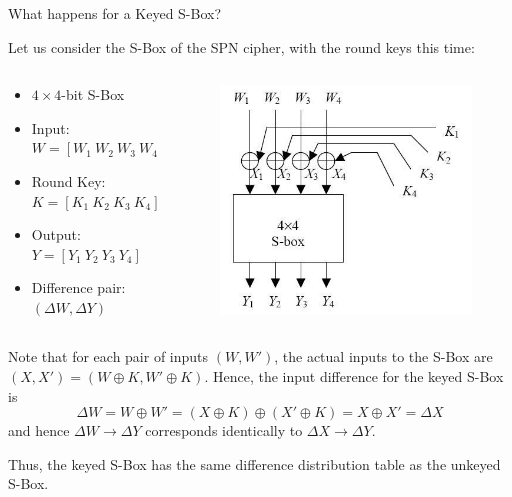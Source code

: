 \documentclass[9pt]{beamer}
\begin{document}
\begin{frame}
What happens for a Keyed S-Box?

Let us consider the S-Box of the SPN cipher, with the round keys this time:
\begin{columns}
\begin{column}{0.5\textwidth}
\begin{itemize}
\item{$4 \times 4$-bit S-Box}
\item{Input: $W = [W_1 \: W_2 \: W_3 \: W_4]$}
\item{Round Key: $K = [K_1 \: K_2 \: K_3 \: K_4]$}
\item{Output: $Y = [Y_1 \: Y_2 \: Y_3 \: Y_4]$}
\item{Difference pair: $(\Delta W, \Delta Y)$}
\end{itemize}
\end{column}
\begin{column}{0.5\textwidth}
\begin{figure}
\includegraphics[totalheight=0.3\textheight]{spn_sbox_keyed.jpg}
\end{figure}
\end{column}
\end{columns}

Note that for each pair of inputs $(W,W')$, the actual inputs to the S-Box are $(X,X') = (W \oplus K, W' \oplus K)$. Hence, the input difference for the keyed S-Box is 
\[ \Delta W = W \oplus W' = (X \oplus K) \oplus (X' \oplus K) = X \oplus X' = \Delta X \]
and hence $\Delta W \rightarrow \Delta Y$ corresponds identically to $\Delta X \rightarrow \Delta Y$.

Thus, the keyed S-Box has the same difference distribution table as the unkeyed S-Box.
\end{frame}
\end{document}
